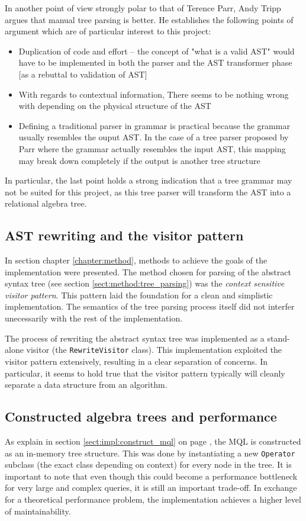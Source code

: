 In another point of view strongly polar to that of Terence Parr, Andy Tripp
argues\cite{manual_tree_walking_is_better} that manual tree parsing is
better. He establishes the following points of argument which are of particular
interest to this project:
\begin{itemize}
  \item Duplication of code and effort -- the concept of "what is a valid AST"
  would have to be implemented in both the parser and the AST transformer phase
  [as a rebuttal to validation of AST]
  \item With regards to contextual information, There seems to be nothing wrong
  with depending on the physical structure of the AST 
  \item Defining a traditional parser in grammar is practical because the grammar
  usually resembles the ouput AST. In the case of a tree parser proposed by Parr
  where the grammar actually resembles the input AST, this mapping may break
  down completely if the output is another tree structure
\end{itemize}

In particular, the last point holds a strong indication that a tree grammar
may not be suited for this project, as this tree parser will transform the AST
into a relational algebra tree.

\subsection{AST rewriting and the visitor pattern}
In section chapter \ref{chapter:method}, methods to achieve the goals
of the implementation were presented. The method chosen for parsing of the
abstract syntax tree (see section \ref{sect:method:tree_parsing}) was the
\emph{context sensitive visitor pattern}. This pattern laid the foundation for
a clean and simplistic implementation. The semantics of the tree parsing process
itself did not interfer unecessarily with the rest of the implementation.

The process of rewriting the abstract syntax tree was implemented as a
stand-alone visitor (the \texttt{RewriteVisitor} class). This implementation
exploited the visitor pattern extensively, resulting in a clear separation of
concerns. In particular, it seems to hold true that the visitor pattern
typically will cleanly separate a data structure from an algorithm.

\subsection{Constructed algebra trees and performance}
As explain in section \ref{sect:impl:construct_mql} on page
\pageref{sect:impl:construct_mql}, the MQL is constructed as an in-memory tree
structure. This was done by instantiating a new \texttt{Operator} subclass
(the exact class depending on context) for every node in the tree. It is
important to note that even though this could become a performance bottleneck
for very large and complex queries, it is still an important trade-off. In
exchange for a theoretical performance problem, the implementation achieves a
higher level of maintainability.